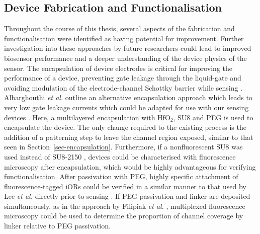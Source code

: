\documentclass[
  a4paper,
]{scrbook}
\begin{document}
\hypertarget{sec-future-work-fabrication}{%
\subsection{Device Fabrication and
Functionalisation}\label{sec-future-work-fabrication}}

Throughout the course of this thesis, several aspects of the fabrication
and functionalisation were identified as having potential for
improvement. Further investigation into these approaches by future
researchers could lead to improved biosensor performance and a deeper
understanding of the device physics of the sensor. The encapsulation of
device electrodes is critical for improving the performance of a device,
preventing gate leakage through the liquid-gate and avoiding modulation
of the electrode-channel Schottky barrier while sensing
\autocite{Lim2014,Albarghouthi2022,Heller2008}. Albarghouthi \emph{et
al.} outline an alternative encapsulation approach which leads to very
low gate leakage currents which could be adapted for use with our
sensing devices \autocite{Albarghouthi2022}. Here, a multilayered
encapsulation with HfO\(_2\), SU8 and PEG is used to encapsulate the
device. The only change required to the existing process is the addition
of a patterning step to leave the channel region exposed, similar to
that seen in Section~\ref{sec-encapsulation}. Furthermore, if a
nonfluorescent SU8 was used instead of SU8-2150 \autocite{Vobornik2023},
devices could be characterised with fluorescence microscopy after
encapsulation, which would be highly advantageous for verifying
functionalisation. After passivation with PEG, highly specific
attachment of fluorescence-tagged iORs could be verified in a similar
manner to that used by Lee \emph{et al.} directly prior to sensing
\autocite{Lee2012b}. If PEG passivation and linker are deposited
simultaneously, as in the approach by Filipiak \emph{et al.}
\autocite{Filipiak2018}, multiplexed fluorescence microscopy could be
used to determine the proportion of channel coverage by linker relative
to PEG passivation.
\end{document}
